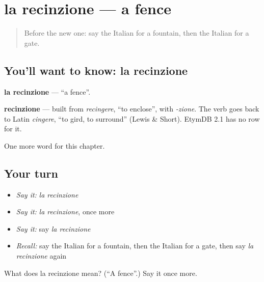 \section[la recinzione]{la recinzione — a fence}

\label{lesson:IT-C255-recinzione}



\begin{quote}
Before the new one: say the Italian for a fountain, then the Italian for a gate.
\end{quote}

\subsection*{You'll want to know: la recinzione}
\textbf{la recinzione} — \textquotedblleft{}a fence\textquotedblright{}.

\begin{cousinweb}
\textbf{recinzione} — built from \emph{recingere}, \textquotedblleft{}to enclose\textquotedblright{}, with \emph{-zione}. The verb goes back to Latin \emph{cingere}, \textquotedblleft{}to gird, to surround\textquotedblright{} (Lewis \& Short). EtymDB 2.1 has no row for it.
\end{cousinweb}

\begin{grammarlens}[title={What you've built}]
One more word for this chapter.
\end{grammarlens}

\subsection*{Your turn}
\begin{itemize}
\raggedright
  \item \emph{Say it:} \emph{la recinzione}
  \item \emph{Say it:} \emph{la recinzione}, once more
  \item \emph{Say it:} say \emph{la recinzione}
  \item \emph{Recall:} say the Italian for a fountain, then the Italian for a gate, then say \emph{la recinzione} again
\end{itemize}

\begin{tcolorbox}[breakable,colback=teal!4,colframe=teal!35!black,title={Before you move on}]
What does la recinzione mean? (\textquotedblleft{}A fence\textquotedblright{}.) Say it once more.
\end{tcolorbox}
